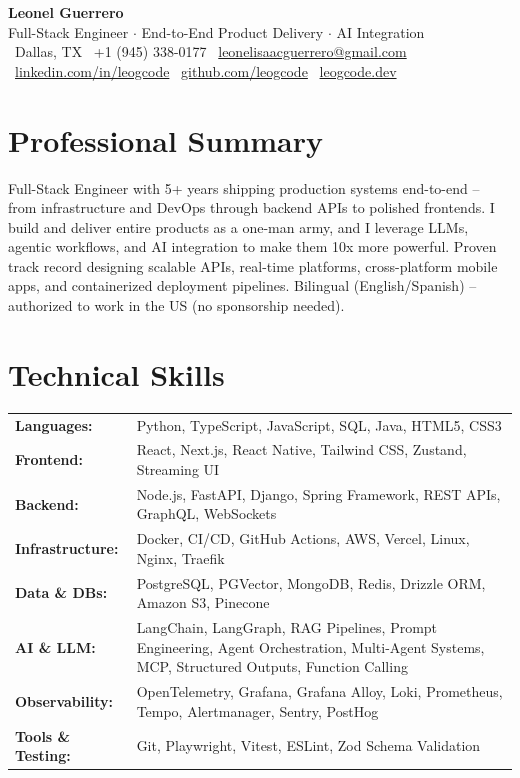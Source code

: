 \documentclass[letterpaper,11pt]{article}
\begin{document}
\begin{center}
    {\Huge\bfseries\color{primary} Leonel Guerrero} \\[6pt]
    {\large Full-Stack Engineer $\cdot$ End-to-End Product Delivery $\cdot$ AI Integration} \\[6pt]
    \small
    \ Dallas, TX \quad
    \ +1 (945) 338-0177 \quad
    \ \href{mailto:leonelisaacguerrero@gmail.com}{leonelisaacguerrero@gmail.com} \\[3pt]
    \ \href{https://www.linkedin.com/in/leogcode}{linkedin.com/in/leogcode} \quad
    \ \href{https://github.com/leogcode}{github.com/leogcode} \quad
    \ \href{https://leogcode.dev}{leogcode.dev}
\end{center}

\section{Professional Summary}
Full-Stack Engineer with 5+ years shipping production systems end-to-end -- from infrastructure and DevOps through backend APIs to polished frontends. I build and deliver entire products as a one-man army, and I leverage LLMs, agentic workflows, and AI integration to make them 10x more powerful. Proven track record designing scalable APIs, real-time platforms, cross-platform mobile apps, and containerized deployment pipelines. Bilingual (English/Spanish) -- authorized to work in the US (no sponsorship needed).

\section{Technical Skills}
\begin{tabularx}{\textwidth}{@{}l X@{}}
    \textbf{Languages:} & Python, TypeScript, JavaScript, SQL, Java, HTML5, CSS3 \\[3pt]
    \textbf{Frontend:} & React, Next.js, React Native, Tailwind CSS, Zustand, Streaming UI \\[3pt]
    \textbf{Backend:} & Node.js, FastAPI, Django, Spring Framework, REST APIs, GraphQL, WebSockets \\[3pt]
    \textbf{Infrastructure:} & Docker, CI/CD, GitHub Actions, AWS, Vercel, Linux, Nginx, Traefik \\[3pt]
    \textbf{Data \& DBs:} & PostgreSQL, PGVector, MongoDB, Redis, Drizzle ORM, Amazon S3, Pinecone \\[3pt]
    \textbf{AI \& LLM:} & LangChain, LangGraph, RAG Pipelines, Prompt Engineering, Agent Orchestration, Multi-Agent Systems, MCP, Structured Outputs, Function Calling \\[3pt]
    \textbf{Observability:} & OpenTelemetry, Grafana, Grafana Alloy, Loki, Prometheus, Tempo, Alertmanager, Sentry, PostHog \\[3pt]
    \textbf{Tools \& Testing:} & Git, Playwright, Vitest, ESLint, Zod Schema Validation \\
\end{tabularx}
\end{document}
